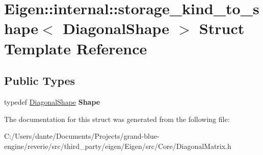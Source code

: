 \hypertarget{struct_eigen_1_1internal_1_1storage__kind__to__shape_3_01_diagonal_shape_01_4}{}\section{Eigen\+::internal\+::storage\+\_\+kind\+\_\+to\+\_\+shape$<$ Diagonal\+Shape $>$ Struct Template Reference}
\label{struct_eigen_1_1internal_1_1storage__kind__to__shape_3_01_diagonal_shape_01_4}
\subsection*{Public Types}
\begin{DoxyCompactItemize}
\item 
\mbox{\label{struct_eigen_1_1internal_1_1storage__kind__to__shape_3_01_diagonal_shape_01_4_a1f2f5c3952c7b90d86a2039e6c5cd8dc}} 
typedef \mbox{\hyperlink{struct_eigen_1_1_diagonal_shape}{Diagonal\+Shape}} {\bfseries Shape}
\end{DoxyCompactItemize}


The documentation for this struct was generated from the following file\+:\begin{DoxyCompactItemize}
\item 
C\+:/\+Users/dante/\+Documents/\+Projects/grand-\/blue-\/engine/reverie/src/third\+\_\+party/eigen/\+Eigen/src/\+Core/Diagonal\+Matrix.\+h\end{DoxyCompactItemize}
